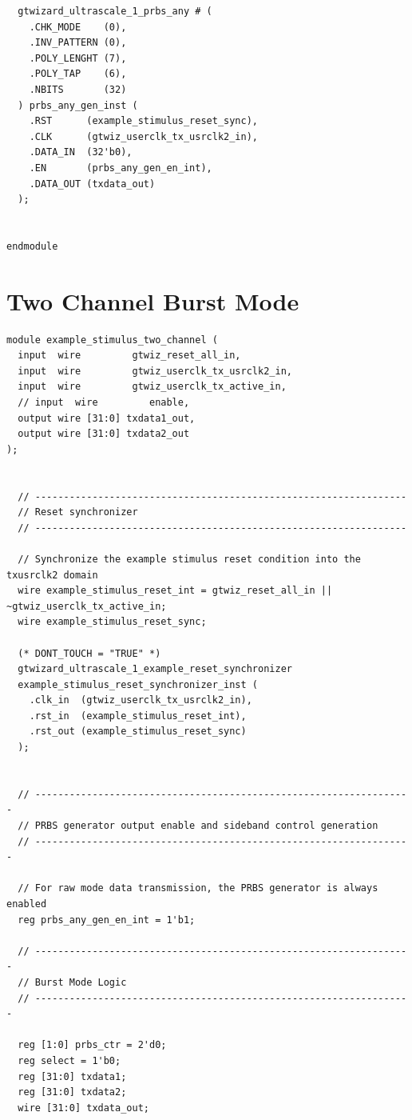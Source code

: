 \documentclass[oneside]{discothesis}
\begin{document}
\begin{verbatim}
  gtwizard_ultrascale_1_prbs_any # (
    .CHK_MODE    (0),
    .INV_PATTERN (0),
    .POLY_LENGHT (7),
    .POLY_TAP    (6),
    .NBITS       (32)
  ) prbs_any_gen_inst (
    .RST      (example_stimulus_reset_sync),
    .CLK      (gtwiz_userclk_tx_usrclk2_in),
    .DATA_IN  (32'b0),
    .EN       (prbs_any_gen_en_int),
    .DATA_OUT (txdata_out)
  );


endmodule
\end{verbatim}
\cleardoublepage

\section{Two Channel Burst Mode}%
\label{sec:two_channel_burst_mode}
\begin{verbatim}
module example_stimulus_two_channel (
  input  wire         gtwiz_reset_all_in,
  input  wire         gtwiz_userclk_tx_usrclk2_in,
  input  wire         gtwiz_userclk_tx_active_in,
  // input  wire         enable,
  output wire [31:0] txdata1_out,
  output wire [31:0] txdata2_out
);


  // -----------------------------------------------------------------
  // Reset synchronizer
  // -----------------------------------------------------------------

  // Synchronize the example stimulus reset condition into the txusrclk2 domain
  wire example_stimulus_reset_int = gtwiz_reset_all_in || ~gtwiz_userclk_tx_active_in;
  wire example_stimulus_reset_sync;

  (* DONT_TOUCH = "TRUE" *)
  gtwizard_ultrascale_1_example_reset_synchronizer
  example_stimulus_reset_synchronizer_inst (
    .clk_in  (gtwiz_userclk_tx_usrclk2_in),
    .rst_in  (example_stimulus_reset_int),
    .rst_out (example_stimulus_reset_sync)
  );


  // ------------------------------------------------------------------
  // PRBS generator output enable and sideband control generation
  // ------------------------------------------------------------------

  // For raw mode data transmission, the PRBS generator is always enabled
  reg prbs_any_gen_en_int = 1'b1;
  
  // ------------------------------------------------------------------
  // Burst Mode Logic
  // ------------------------------------------------------------------

  reg [1:0] prbs_ctr = 2'd0;
  reg select = 1'b0;
  reg [31:0] txdata1;
  reg [31:0] txdata2;
  wire [31:0] txdata_out;



\end{verbatim}
\end{document}
